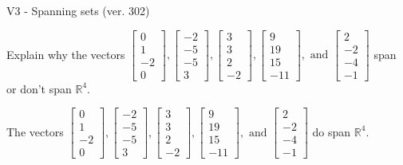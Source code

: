 \begin{exercise}
  \begin{exerciseTitle}V3 - Spanning sets (ver. 302)\end{exerciseTitle}
  \begin{exerciseStatement}
    Explain why the vectors \(\left[\begin{array}{r}
0 \\
1 \\
-2 \\
0
\end{array}\right] , \left[\begin{array}{r}
-2 \\
-5 \\
-5 \\
3
\end{array}\right] , \left[\begin{array}{r}
3 \\
3 \\
2 \\
-2
\end{array}\right] , \left[\begin{array}{r}
9 \\
19 \\
15 \\
-11
\end{array}\right] , \text{ and } \left[\begin{array}{r}
2 \\
-2 \\
-4 \\
-1
\end{array}\right]\) span or don't span \(\mathbb{R}^4\). 
	


  \end{exerciseStatement}
  \begin{exerciseAnswer}
   The vectors \(\left[\begin{array}{r}
0 \\
1 \\
-2 \\
0
\end{array}\right] , \left[\begin{array}{r}
-2 \\
-5 \\
-5 \\
3
\end{array}\right] , \left[\begin{array}{r}
3 \\
3 \\
2 \\
-2
\end{array}\right] , \left[\begin{array}{r}
9 \\
19 \\
15 \\
-11
\end{array}\right] , \text{ and } \left[\begin{array}{r}
2 \\
-2 \\
-4 \\
-1
\end{array}\right]\) 
  	 do  
	span \(\mathbb{R}^4\).
  



\end{exerciseAnswer}
\end{exercise}
